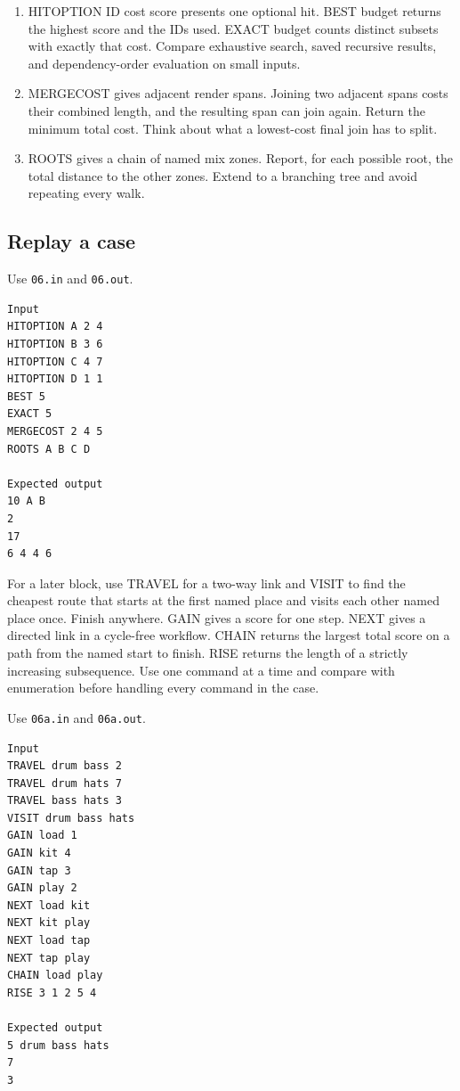 \documentclass[11pt,letterpaper]{article}
\begin{document}
\begin{enumerate}
\item HITOPTION ID cost score presents one optional hit. BEST budget returns the highest score and the IDs used. EXACT budget counts distinct subsets with exactly that cost. Compare exhaustive search, saved recursive results, and dependency-order evaluation on small inputs.
\item MERGECOST gives adjacent render spans. Joining two adjacent spans costs their combined length, and the resulting span can join again. Return the minimum total cost. Think about what a lowest-cost final join has to split.
\item ROOTS gives a chain of named mix zones. Report, for each possible root, the total distance to the other zones. Extend to a branching tree and avoid repeating every walk.
\end{enumerate}

\subsection*{Replay a case}

Use \texttt{06.in} and \texttt{06.out}.

\begin{samepage}
\small
\begin{verbatim}
Input
HITOPTION A 2 4
HITOPTION B 3 6
HITOPTION C 4 7
HITOPTION D 1 1
BEST 5
EXACT 5
MERGECOST 2 4 5
ROOTS A B C D

Expected output
10 A B
2
17
6 4 4 6
\end{verbatim}
\end{samepage}

For a later block, use TRAVEL for a two-way link and VISIT to find the cheapest route that starts at the first named place and visits each other named place once. Finish anywhere. GAIN gives a score for one step. NEXT gives a directed link in a cycle-free workflow. CHAIN returns the largest total score on a path from the named start to finish. RISE returns the length of a strictly increasing subsequence. Use one command at a time and compare with enumeration before handling every command in the case.

Use \texttt{06a.in} and \texttt{06a.out}.

\begin{samepage}
\small
\begin{verbatim}
Input
TRAVEL drum bass 2
TRAVEL drum hats 7
TRAVEL bass hats 3
VISIT drum bass hats
GAIN load 1
GAIN kit 4
GAIN tap 3
GAIN play 2
NEXT load kit
NEXT kit play
NEXT load tap
NEXT tap play
CHAIN load play
RISE 3 1 2 5 4

Expected output
5 drum bass hats
7
3
\end{verbatim}
\end{samepage}
\end{document}
